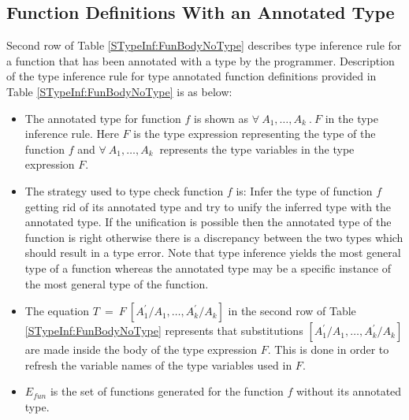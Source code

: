 \documentclass[11pt]{article}
\begin{document}
\subsection {Function Definitions With an Annotated Type}\label{STypeInf:FDefnYType}
Second row of Table \ref {STypeInf:FunBodyNoType} describes type inference rule for a function that has been annotated with a type by the programmer. Description of the type inference rule for type annotated function definitions provided in Table \ref {STypeInf:FunBodyNoType} is as below:
\begin{itemize}
  \item The annotated type for function ${f}$ is shown as ${\forall~A_1,\ldots,A_k~.~F}$ in the type inference rule. Here ${F}$ is the type expression representing the type of the function ${f}$ and ${\forall~A_1,\ldots,A_k~}$ represents the type variables in the type expression ${F}$.
  \item The strategy used to type check function ${f}$ is: Infer the type of function ${f}$ getting rid of its annotated type and try to unify the inferred type with the annotated type. If the unification is possible then the annotated type of the function is right otherwise there is a discrepancy between the two types which should result in a type error. Note that type inference yields the most general type of a function whereas the annotated type may be a specific instance of the most general type of the function. 
  \item The equation ${T~=~F~[A_1^\prime/A_1,\ldots,A_k^\prime/A_k]}$ in the second row of Table \ref {STypeInf:FunBodyNoType} represents that
   substitutions ${[A_1^\prime/A_1,\ldots,A_k^\prime/A_k]}$ are made inside the body of the type expression ${F}$. This is done in order to refresh the variable names of the type variables used in ${F}$.
  \item ${E_{fun}}$ is the set of functions generated for the function ${f}$ without its annotated type.
\end{itemize}
\end{document}
